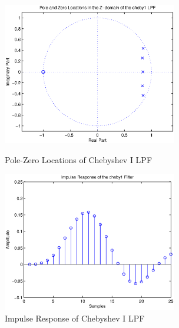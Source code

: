\documentclass{article}
\begin{document}
\begin{figure}[htb]
\begin{minipage}[b]{0.5\linewidth}
\centering
\includegraphics[width=3in]{project6_05.eps}
\caption{Pole-Zero Locations of  Chebyshev I LPF}
\label{fig:figure5}
\end{minipage}
\hspace{0.5cm}
\begin{minipage}[b]{0.5\linewidth}
\centering
\includegraphics[width=3in]{project6_06.eps}
\caption{Impulse Response of  Chebyshev I LPF}
\label{fig:figure6}
\end{minipage}
\end{figure}
\end{document}
